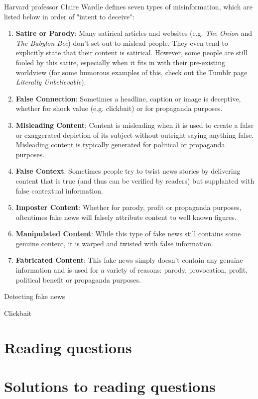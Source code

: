 \documentclass[class=book, crop=false]{standalone}
\begin{document}
Harvard professor Claire Wardle defines seven types of misinformation, which are listed below in order of "intent to deceive":
\begin{enumerate}
    \item \textbf{Satire or Parody}: Many satirical articles and websites (e.g. \textit{The Onion} and \textit{The Babylon Bee}) don't set out to mislead people. They even tend to explicitly state that their content is satirical. However, some people are still fooled by this satire, especially when it fits in with their pre-existing worldview (for some humorous examples of this, check out the Tumblr page \textit{Literally Unbelievable}).
    \item \textbf{False Connection}: Sometimes a headline, caption or image is deceptive, whether for shock value (e.g. clickbait) or for propaganda purposes.
    \item \textbf{Misleading Content}: Content is misleading when it is used to create a false or exaggerated depiction of its subject without outright saying anything false. Misleading content is typically generated for political or propaganda purposes.
    \item \textbf{False Context}: Sometimes people try to twist news stories by delivering content that is true (and thus can be verified by readers) but supplanted with false contextual information.
    \item \textbf{Imposter Content}: Whether for parody, profit or propaganda purposes, oftentimes fake news will falsely attribute content to well known figures.
    \item \textbf{Manipulated Content}: While this type of fake news still contains some genuine content, it is warped and twisted with false information.
    \item \textbf{Fabricated Content}: This fake news simply doesn't contain any genuine information and is used for a variety of reasons: parody, provocation, profit, political benefit or propaganda purposes.
\end{enumerate}

Detecting fake news

Clickbait

\section{Reading questions}

\section{Solutions to reading questions}
\end{document}

